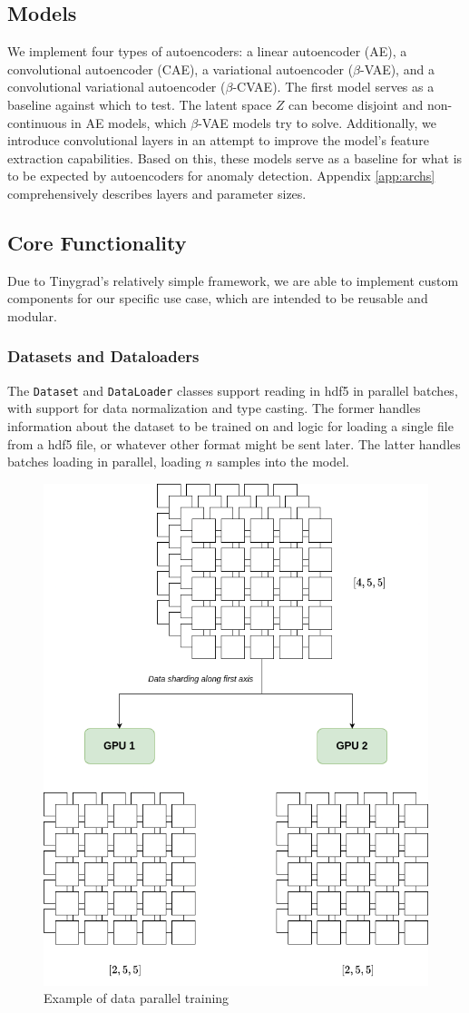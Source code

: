 \subsection{Models} 

We implement four types of autoencoders: a linear autoencoder (AE), a convolutional autoencoder (CAE), a variational autoencoder ($\beta$-VAE), and a convolutional variational autoencoder ($\beta$-CVAE). The first model serves as a baseline against which to test. The latent space $Z$ can become disjoint and non-continuous in AE models, which $\beta$-VAE models try to solve. Additionally, we introduce convolutional layers in an attempt to improve the model's feature extraction capabilities. Based on this, these models serve as a baseline for what is to be expected by autoencoders for anomaly detection. Appendix \ref{app:archs} comprehensively describes layers and parameter sizes. \\

\subsection{Core Functionality}

Due to Tinygrad's relatively simple framework, we are able to implement custom components for our specific use case, which are intended to be reusable and modular.

\subsubsection{Datasets and Dataloaders}

The \texttt{Dataset} and \texttt{DataLoader} classes support reading in \acrshort{hdf5} in parallel batches, with support for data normalization and type casting. The former handles information about the dataset to be trained on and logic for loading a single file from a \acrshort{hdf5} file, or whatever other format might be sent later. The latter handles batches loading in parallel, loading $n$ samples into the model.

\begin{figure}[!h]
    \centering
    \includegraphics[width=0.5\linewidth]{figures/sharding.png}
    \caption{Example of data parallel training}
    \label{fig:dataparallel}
\end{figure}

